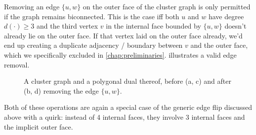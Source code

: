 Removing an edge $\{u,w\}$ on the outer face of the cluster graph is only permitted if the graph remains biconnected.
This is the case iff both $u$ and $w$ have degree $d(\cdot) \geq 3$ and the third vertex $v$ in the internal face bounded by $\{u,w\}$ doesn't already lie on the outer face.
If that vertex laid on the outer face already, we'd end up creating a duplicate adjacency / boundary between $v$ and the outer face, which we specifically excluded in \cref{chap:preliminaries}.
 illustrates a valid edge removal.

\begin{figure}[H]
	\centering
	\quad
	\qquad
	\quad
	\caption{A cluster graph and a polygonal dual thereof, before (a, c) and after (b, d) removing the edge $\{u,w\}$.}
	\label{fig:flip-edge-example-remove}
\end{figure}

Both of these operations are again a special case of the generic edge flip discussed above with a quirk: instead of 4 internal faces, they involve 3 internal faces and the implicit outer face.

